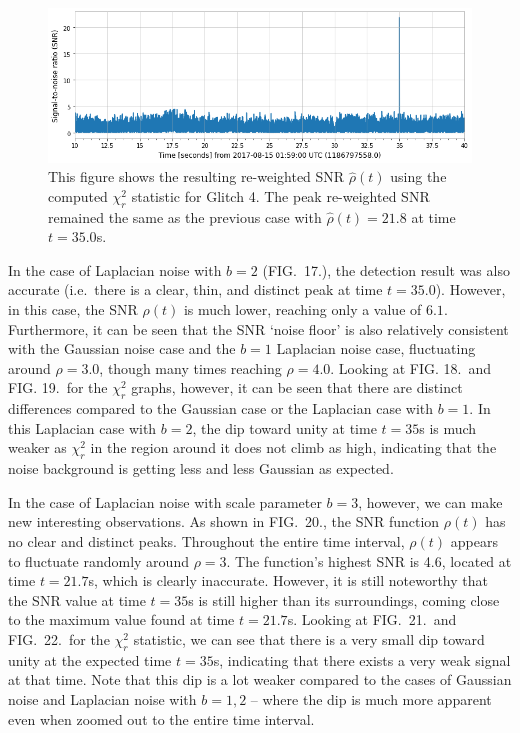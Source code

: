 \documentclass[preprint,
letterpaper,
 amsmath,amssymb,
 aps,
]{revtex4-2}
\begin{document}
\begin{figure}[t]
\includegraphics[width = .9\textwidth]{reweighted glitch 4.png}
\caption{This figure shows the resulting re-weighted SNR $\hat{\rho}(t)$ using the computed $\chi^2_r$ statistic for Glitch 4. The peak re-weighted SNR remained the same as the previous case with $\hat{\rho}(t)=21.8$ at time $t=35.0$s.}
\centering
\end{figure}

In the case of Laplacian noise with $b=2$ (FIG.\ 17.), the detection result was also accurate (i.e.\ there is a clear, thin, and distinct peak at time $t=35.0$). However, in this case, the SNR $\rho(t)$ is much lower, reaching only a value of $6.1$. Furthermore, it can be seen that the SNR `noise floor' is also relatively consistent with the Gaussian noise case and the $b=1$ Laplacian noise case, fluctuating around $\rho = 3.0$, though many times reaching $\rho = 4.0$. Looking at FIG. 18.\ and FIG. 19.\ for the $\chi_r^2$ graphs, however, it can be seen that there are distinct differences compared to the Gaussian case or the Laplacian case with $b=1$. In this Laplacian case with $b=2$, the dip toward unity at time $t=35$s is much weaker as $\chi^2_r$ in the region around it does not climb as high, indicating that the noise background is getting less and less Gaussian as expected. 

In the case of Laplacian noise with scale parameter $b=3$, however, we can make new interesting observations. As shown in FIG.\ 20., the SNR function $\rho(t)$ has no clear and distinct peaks. Throughout the entire time interval, $\rho(t)$ appears to fluctuate randomly around $\rho = 3$. The function's highest SNR is 4.6, located at time $t=21.7$s, which is clearly inaccurate. However, it is still noteworthy that the SNR value at time $t=35$s is still higher than its surroundings, coming close to the maximum value found at time $t=21.7$s. Looking at FIG.\ 21.\ and FIG.\ 22.\ for the $\chi_r^2$ statistic, we can see that there is a very small dip toward unity at the expected time $t=35$s, indicating that there exists a very weak signal at that time. Note that this dip is a lot weaker compared to the cases of Gaussian noise and Laplacian noise with $b=1,2$ – where the dip is much more apparent even when zoomed out to the entire time interval.
\end{document}
